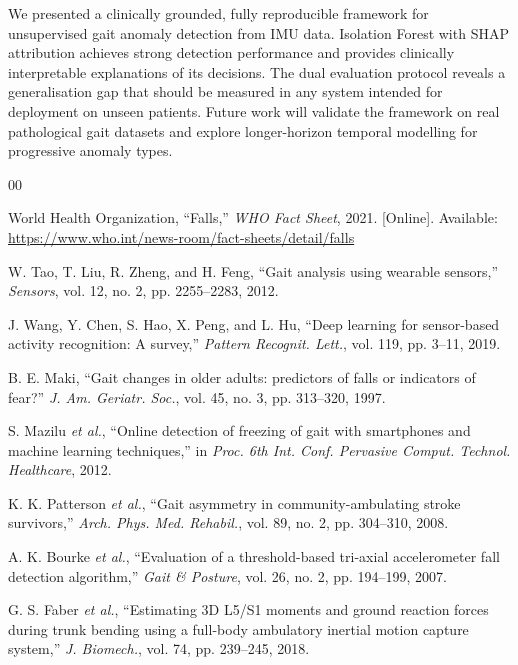 \documentclass[conference]{IEEEtran}
\begin{document}
We presented a clinically grounded, fully reproducible framework for
unsupervised gait anomaly detection from IMU data.
Isolation Forest with SHAP attribution achieves strong detection
performance and provides clinically interpretable explanations of its
decisions.
The dual evaluation protocol reveals a generalisation gap that should be
measured in any system intended for deployment on unseen patients.
Future work will validate the framework on real pathological gait datasets
and explore longer-horizon temporal modelling for progressive anomaly types.

\begin{thebibliography}{00}

World Health Organization, ``Falls,''
\textit{WHO Fact Sheet}, 2021.
[Online]. Available: \url{https://www.who.int/news-room/fact-sheets/detail/falls}

W. Tao, T. Liu, R. Zheng, and H. Feng,
``Gait analysis using wearable sensors,''
\textit{Sensors}, vol. 12, no. 2, pp. 2255–2283, 2012.

J. Wang, Y. Chen, S. Hao, X. Peng, and L. Hu,
``Deep learning for sensor-based activity recognition: A survey,''
\textit{Pattern Recognit. Lett.}, vol. 119, pp. 3–11, 2019.

B. E. Maki,
``Gait changes in older adults: predictors of falls or indicators of fear?''
\textit{J. Am. Geriatr. Soc.}, vol. 45, no. 3, pp. 313–320, 1997.

S. Mazilu \textit{et al.},
``Online detection of freezing of gait with smartphones and machine learning techniques,''
in \textit{Proc. 6th Int. Conf. Pervasive Comput. Technol. Healthcare}, 2012.

K. K. Patterson \textit{et al.},
``Gait asymmetry in community-ambulating stroke survivors,''
\textit{Arch. Phys. Med. Rehabil.}, vol. 89, no. 2, pp. 304–310, 2008.

A. K. Bourke \textit{et al.},
``Evaluation of a threshold-based tri-axial accelerometer fall detection algorithm,''
\textit{Gait \& Posture}, vol. 26, no. 2, pp. 194–199, 2007.

G. S. Faber \textit{et al.},
``Estimating 3D L5/S1 moments and ground reaction forces during trunk bending
using a full-body ambulatory inertial motion capture system,''
\textit{J. Biomech.}, vol. 74, pp. 239–245, 2018.


\end{thebibliography}
\end{document}

